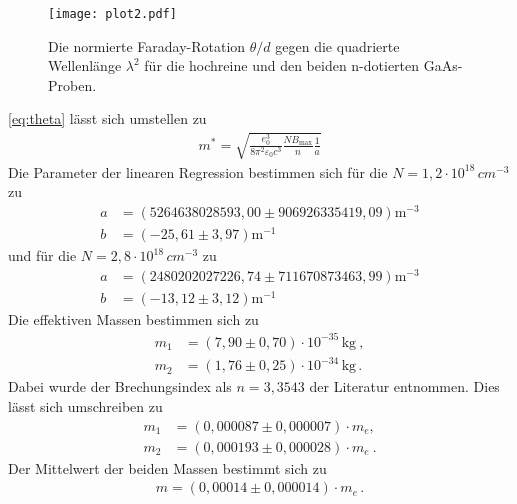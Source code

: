 \begin{figure}[hbt!]
  \label{fig:diff}
  \texttt{[image: plot2.pdf]}
  \caption{Die normierte Faraday-Rotation $\theta/d$ gegen die quadrierte Wellenlänge $\lambda^2$ für die
  hochreine und den beiden n-dotierten GaAs-Proben.}
\end{figure}
\autoref{eq:theta} lässt sich umstellen zu
 \begin{align*}
  m^{*} = \sqrt{\frac{e_0^3}{8\pi^2 \varepsilon_0 c^3} \frac{N B_\text{max}}{n} \frac{1}{a}}
  \end{align*}
Die Parameter der linearen Regression bestimmen sich für die $N=1,2\cdot 10^{18}\,cm^{-3}$ zu
\begin{align*}
  a &= (5264638028593,00 \pm 906926335419,09) \si{\meter}^{-3} \\
  b &= (-25,61 \pm 3,97) \si{\meter}^{-1}
\end{align*}
und für die $N=2,8\cdot 10^{18}\,cm^{-3}$ zu
\begin{align*}
  a &= (2480202027226,74 \pm 711670873463,99) \si{\meter}^{-3} \\
  b &= (-13,12 \pm 3,12) \si{\meter}^{-1}
\end{align*}
Die effektiven Massen bestimmen sich zu
\begin{align*}
  m_1 &= (7,90 \pm 0,70)\cdot 10^{-35}\,\si{\kilogram}\:, \\
  m_2 &= (1,76 \pm 0,25)\cdot 10^{-34}\,\si{\kilogram}\,.
\end{align*}
Dabei wurde der Brechungsindex als $n=3,3543$ der Literatur entnommen. \cite{Brechungsindex}
Dies lässt sich umschreiben zu
\begin{align*}
  m_1 &= (0,000087 \pm 0,000007)\cdot m_{e}, \\
  m_2 &= (0,000193 \pm 0,000028)\cdot m_{e}\: .
\end{align*}
Der Mittelwert der beiden Massen bestimmt sich zu
\begin{align*}
  m = (0,00014 \pm 0,000014)\cdot m_e \,.
\end{align*}